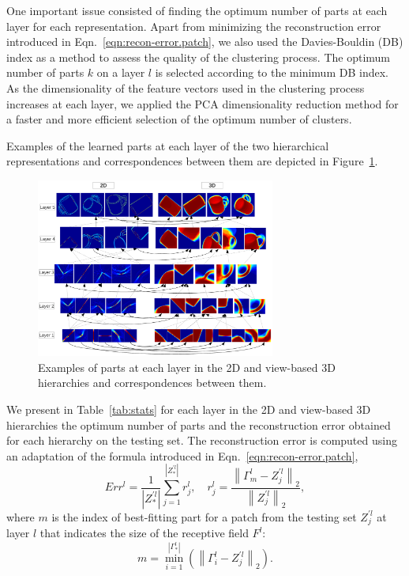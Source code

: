 \documentclass[runningheads]{llncs}
\begin{document}
One important issue consisted of finding the optimum number of parts at each layer for each representation. Apart from minimizing the reconstruction error introduced in Eqn.~\ref{eqn:recon-error.patch}, we also used the Davies-Bouldin (DB) index \cite{Bouldin97} as a method to assess the quality of the clustering process. The optimum number of parts $k$ on a layer $l$ is selected according to the minimum DB index. As the dimensionality of the feature vectors used in the clustering process increases at each layer, we applied the PCA dimensionality reduction method for a faster and more efficient selection of the optimum number of clusters.

Examples of the learned parts at each layer of the two hierarchical representations and correspondences between them are depicted in Figure~\ref{hierarchy}.

\begin{figure}
\begin{center}
\includegraphics[width=0.7\textwidth]{hierarchy}
\end{center}
\caption{Examples of parts at each layer in the 2D and view-based 3D hierarchies and correspondences between them.}
\label{hierarchy}
\end{figure}

We present in Table~\ref{tab:stats} for each layer in the 2D and view-based 3D hierarchies the optimum number of parts and the reconstruction error obtained for each hierarchy on the testing set. The reconstruction error is computed using an adaptation of the formula introduced in Eqn.~\ref{eqn:recon-error.patch},
\begin{equation}
 Err^l = \frac{1}{|Z_*^{'l}|} \sum_{j=1}^{|Z_*^{'l}|} r_j^l,\quad
 r_j^l = \frac{\left\|\Gamma_m^l-Z_j^{'l}\right\|_2}{\left\|Z_j^{'l}\right\|_2},
 \label{eq:r}
\end{equation}
where $m$ is the index of best-fitting part for a patch from the testing set $Z_j^{'l}$ at layer $l$ that indicates the size of the receptive field $F^l$:
 \begin{equation}
 m=\min_{i=1}^{|\Gamma_*^l|}(\left\|\Gamma_i^l-Z_j^{'l}\right\|_2).
\end{equation}
\end{document}
